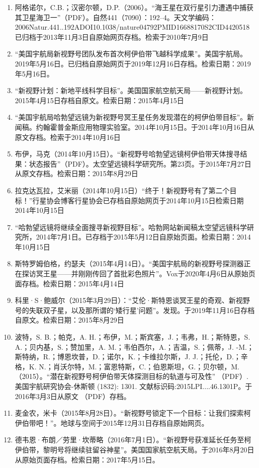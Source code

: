 \begin{enumerate}
\item 阿格诺尔，C.B.；汉密尔顿，D.P.（2006）。“海王星在双行星引力遭遇中捕获其卫星海卫一”（PDF）。自然441（7090）：192–4。天文学编码：2006Natur.441..192ADOI10.1038/nature04792PMID16688170S2CID4420518已归档于2013年11月3日自原始网页存档。检索于2010年7月9日
\item “美国宇航局新视野号团队发布首次柯伊伯带飞越科学成果”。美国宇航局。2019年5月16日。已归档自原始网页于2019年12月16日存档。检索日期：2019年5月16日。
\item “新视野计划：新地平线科学目标”。美国国家航空航天局——新视野计划。2015年4月15日存档自原文。检索日期：2015年4月15日
\item “美国宇航局哈勃望远镜为新视野号冥王星任务发现潜在的柯伊伯带目标”。新闻稿。约翰霍普金斯应用物理实验室。2014年10月15日。于2014年10月16日从原文存档。检索于2014年10月16日
\item 布伊，马克（2014年10月15日）。“新视野号哈勃望远镜柯伊伯带天体搜寻结果：状态报告”（PDF）。太空望远镜科学研究所。第23页。于2015年7月27日从原文存档。检索日期：2015年8月29日
\item 拉克达瓦拉，艾米丽（2014年10月15日）“终于！新视野号有了第二个目标！”行星协会博客行星协会已存档自原始网页于2014年10月15日检索日期2014年10月15日
\item “哈勃望远镜将继续全面搜寻新视野目标”。哈勃网站新闻稿太空望远镜科学研究所，2014年7月1日。已存档于2015年5月12日自原始页面。检索日期：2014年10月15日
\item 斯特罗姆伯格，约瑟夫（2015年4月14日）。“美国宇航局的新视野号探测器正在探访冥王星——并刚刚传回了首批彩色照片”。Vox于2020年4月6日从原始页面存档。检索日期：2015年4月14日
\item 科里·S·鲍威尔（2015年3月29日）：“艾伦·斯特恩谈冥王星的奇观、新视野号的失联双子星，以及那所谓的‘矮行星’问题”。发现。于2019年11月16日存档自原文。检索日期：2015年8月29日
\item 波特，S. B.；帕克，A. H.；布伊，M.；斯宾塞，J.；韦弗，H.；斯特恩，S. A.；贝内基，S.；赞加里，A. M.；韦伯西尔，A.；吉温，S.；佩蒂，J. -M.；斯特纳，R.；博恩坎普，D.；诺尔，K.；卡维拉尔斯，J. J.；托伦，D.；辛格，K. N.；肖沃尔特，M.；富恩特斯，C.；伯恩斯坦，G.；贝尔顿，M.（2015）。“潜在新视野号柯伊伯带天体探测目标的轨道与可及性” （PDF）. 美国宇航研究协会-休斯顿 (1832): 1301. 文献标识码:2015LPI....46.1301P。于2016年3月3日从原文 （PDF）存档。
\item 麦金农，米卡（2015年8月28日）。“新视野号锁定下一个目标：让我们探索柯伊伯带吧！”。地球与空间于2015年12月31日存档自原始网页。
\item 德韦恩·布朗／劳里·坎蒂略（2016年7月1日）。“新视野号获准延长任务至柯伊伯带，黎明号将继续驻留谷神星”。美国国家航空航天局。于2016年8月20日从原始页面存档。检索日期：2017年5月15日。

\end{enumerate}
